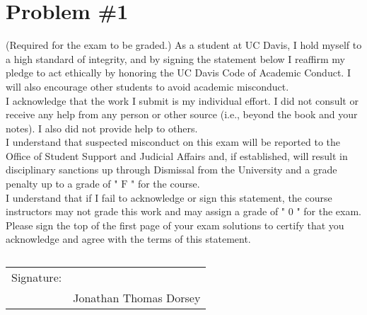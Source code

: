 \section*{Problem \#1}

(Required for the exam to be graded.) As a student at UC Davis, I hold myself to a high standard of integrity, and by signing the statement below I reaffirm my pledge to act ethically by honoring the UC Davis Code of Academic Conduct. I will also encourage other students to avoid academic misconduct. \\

\noindent I acknowledge that the work I submit is my individual effort. I did not consult or receive any help from any person or other source (i.e., beyond the book and your notes). I also did not provide help to others. \\

\noindent I understand that suspected misconduct on this exam will be reported to the Office of Student Support and Judicial Affairs and, if established, will result in disciplinary sanctions up through Dismissal from the University and a grade penalty up to a grade of " $\mathrm{F}$ " for the course. \\

\noindent I understand that if I fail to acknowledge or sign this statement, the course instructors may not grade this work and may assign a grade of " 0 " for the exam. Please sign the top of the first page of your exam solutions to certify that you acknowledge and agree with the terms of this statement.


\subsection*{}


\begin{tabular}{@{}p{.5in}p{4in}@{}}
\noindent Signature: & \hrulefill \\
& \: \:\:\:\:\:\:\:\:\:\:\:\:\:\:\:\:\:\:\:\:\:\:\:\:\:\:\:\:\:\:\:\:\:\:\:\:\:\:\:\:\:\:\:\:\:\:\:\:\:\:\:\:\:\:\:\:\:\:\:\:\:\:\:\:\:\:\:\:\:\:\:\:\: Jonathan Thomas Dorsey

\end{tabular}
